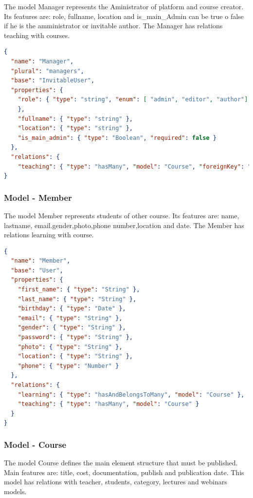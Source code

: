 The model Manager represents the Aministrator of platform and course creator. Its features are: role, fullname, location and is\_main\_Admin can be true o false if he is the amministrator or invitable author. The Manager has relations teaching with courses.

\begin{lstlisting}[language=json]
{
  "name": "Manager",
  "plural": "managers",
  "base": "InvitableUser",
  "properties": {
    "role": { "type": "string", "enum": [ "admin", "editor", "author"]
    },
    "fullname": { "type": "string" },
    "location": { "type": "string" },
    "is_main_admin": { "type": "Boolean", "required": false }
  },
  "relations": {
    "teaching": { "type": "hasMany", "model": "Course", "foreignKey": "teacher_id" }
}
\end{lstlisting}


\subsubsection{ Model - Member}

The model Member represents students of other course. Its features are: name, lastname, email.gender,photo,phone number,location and date. The Member has relations learning with course.

\begin{lstlisting}[language=json]
{
  "name": "Member",
  "base": "User",
  "properties": {
    "first_name": { "type": "String" },
    "last_name": { "type": "String" },   
    "birthday": { "type": "Date" },
    "email": { "type": "String" },
    "gender": { "type": "String" },
    "password": { "type": "String" },
    "photo": { "type": "String" },
    "location": { "type": "String" },
    "phone": { "type": "Number" }
  },
  "relations": {
    "learning": { "type": "hasAndBelongsToMany", "model": "Course" },
    "teaching": { "type": "hasMany", "model": "Course" }
  }
}
\end{lstlisting}


\subsubsection{ Model - Course}

The model Course defines the main element structure that must be published. Main features are: title, cost, documentation, publish and publication date. This model has relations with teacher, students, category, lectures and webinars models.



